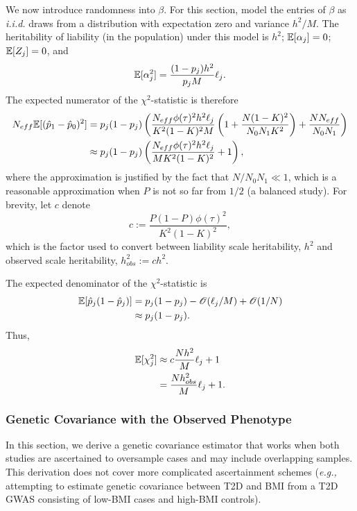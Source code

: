 \documentclass[11pt]{article}
\numberwithin{equation}{section}
\numberwithin{definition}{section}
\numberwithin{thm}{section}
\numberwithin{lemma}{section}
\numberwithin{prop}{section}
\numberwithin{cor}{section}
\numberwithin{hyp}{section}
\begin{document}
We now introduce randomness into $\beta$. 
For this section, model the entries of $\beta$ as \emph{i.i.d.} draws 
from a distribution with expectation zero and variance $h^2/M$.
The heritability of liability (in the population) under this model is $h^2$; 
$\mathbb{E}[\alpha_j]=0$;
$\mathbb{E}[Z_j]=0$, and 
\[
	\mathbb{E}[\alpha_j^2] = \frac{(1-p_j)h^2}{p_jM}\ell_j.
\]
The expected numerator of the $\chi^2$-statistic is therefore
\begin{align*}
	N_{eff}\mathbb{E}[(\hat{p}_1 - \hat{p}_0)^2]
&=
	p_j(1-p_j)\left(\dfrac{N_{eff}\phi(\tau)^2h^2\ell_j}{K^2(1-K)^2M}
	\left(
		1
		+
		\dfrac{N(1-K)^2}{N_0N_1K^2}
	\right)
	+
	\dfrac{NN_{eff}}{N_0N_1}
	\right)\\
&\approx
	p_j(1-p_j)\left(\dfrac{N_{eff}\phi(\tau)^2h^2\ell_j}{MK^2(1-K)^2}
	+
	1\right),
\end{align*}
where the approximation is justified by the fact that $N/N_0N_1 \ll1$,
which is a reasonable approximation when $P$ is not so far from $1/2$ (a balanced study).
For brevity, let $c$ denote
\[
	c := \dfrac{P(1-P)\phi(\tau)^2}{K^2(1-K)^2},
\]
which is the factor used to convert between liability scale heritability, $h^2$ and observed scale heritability, $h^2_{obs} := ch^2$.

The expected denominator of the $\chi^2$-statistic is 
\begin{align*}
	\mathbb{E}[\hat{p}_j(1-\hat{p}_j)]
&=
	p_j(1-p_j) -\mathscr{O}(\ell_j/M)+\mathscr{O}(1/N)\\
&\approx
	p_j(1-p_j).
\end{align*}
Thus,
\begin{align}
	\mathbb{E}[\chi^2_j]
&\approx
	c\dfrac{Nh^2}{M}\ell_j+1\nonumber\\
&=
	\dfrac{Nh^2_{obs}}{M}\ell_j+1.
\end{align}


\subsubsection{Genetic Covariance with the Observed Phenotype}\label{CCA:Genetic Covariance}

In this section, we derive a genetic covariance estimator that works when both studies are ascertained to oversample cases and may include overlapping samples.
This derivation does not cover more complicated ascertainment schemes 
(\emph{e.g.,} attempting to estimate genetic covariance between T2D and BMI from a T2D GWAS consisting of low-BMI cases 
and high-BMI controls).
\end{document}
